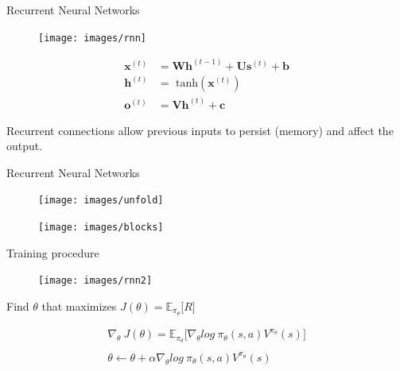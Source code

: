 \documentclass[14pt]{beamer}
\begin{document}
\begin{frame}{Recurrent Neural Networks}

\begin{figure}[htb]
  \texttt{[image: images/rnn]}
\end{figure}
\begin{align*}
  \mathbf{x}^{(t)} &= \mathbf{W} \mathbf{h}^{(t-1)} + \mathbf{U}  \mathbf{s}^{(t)} + \mathbf{b} \\
  \mathbf{h}^{(t)} &= \text{ tanh} \left( \mathbf{x}^{(t)} \right) \\
  \mathbf{o}^{(t)} &= \mathbf{V}  \mathbf{h}^{(t)} + \mathbf{c} 
\end{align*}

\color{colorblue}Recurrent connections allow previous inputs to persist (memory) and affect the output.

\end{frame}

\begin{frame}{Recurrent Neural Networks}

\begin{figure}[htb]
  \texttt{[image: images/unfold]}
\end{figure}

\begin{figure}[htb]
  \texttt{[image: images/blocks]}
\end{figure}

\end{frame}

\begin{frame}{Training procedure}

\begin{figure}[htb]
  \texttt{[image: images/rnn2]}
\end{figure}

Find $\theta$ that maximizes $J(\theta) = \mathbb{E}_{\pi_{\theta}} \lbrack R \rbrack $

\begin{align*}
  \nabla_\theta \: J \left( \theta \right) = \mathbb{E}_{\pi_{\theta}} \lbrack \nabla_{\theta} log \: \pi_{\theta} \left( s,a \right) V^{\pi_{\theta}} \left( s \right) \rbrack \\
  \\
  \theta \leftarrow \theta + \alpha \nabla_{\theta} log \: \pi_{\theta} \left( s,a \right) V^{\pi_{\theta}} \left( s \right)
\end{align*}
\end{frame}
\end{document}
